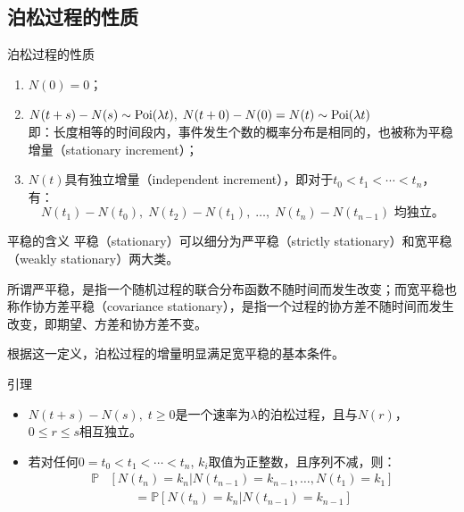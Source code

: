 \documentclass[t]{beamer}
\renewcommand{\Pr}{\mathbb{P}}
\begin{document}
\subsection{泊松过程的性质}
\begin{frame}{泊松过程的性质}
    \begin{enumerate}
        \item $N(0)=0$；

        \item  $N(t+s)-N(s)\sim {\rm Poi}(\lambda t), \; N(t+0)-N(0)=N(t)\sim {\rm Poi}(\lambda t)$\\	
            即：长度相等的时间段内，事件发生个数的概率分布是相同的，也被称为{平稳增量（stationary increment）}； 
            \item  $N(t)$具有{独立增量}（independent increment），即对于$t_0<t_1<\cdots<t_n$，有：
            \[N(t_1)-N(t_0),\; N(t_2)-N(t_1),\; \ldots ,\; N(t_n)-N(t_{n-1}) \text{ 均独立。} \]
    \end{enumerate}
\end{frame}


\begin{frame}{平稳的含义}
    平稳（stationary）可以细分为严平稳（strictly stationary）和宽平稳（weakly stationary）两大类。
    
    所谓严平稳，是指一个随机过程的联合分布函数不随时间而发生改变；而宽平稳也称作协方差平稳（covariance stationary），是指一个过程的协方差不随时间而发生改变，即期望、方差和协方差不变。
    
    根据这一定义，泊松过程的增量明显满足宽平稳的基本条件。
\end{frame}



\begin{frame}{引理}
    \begin{itemize}
        \item 	$N(t+s)-N(s),\; t\ge0$是一个速率为$\lambda$的泊松过程，且与$N(r)$，$0\le r\le s$相互独立。
        \item 若对任何$0=t_0<t_1<\cdots<t_n$, $k_i$取值为正整数，且序列不减，则：
        \[\begin{split}
        \Pr&\left[N(t_n)=k_n|N(t_{n-1})=k_{n-1},\ldots, N(t_1) =k_1\right]\\
         &\qquad=\Pr\left[N(t_n)=k_n|N(t_{n-1})=k_{n-1}\right] 
        \end{split}\]
    \end{itemize}
\end{frame}
\end{document}
